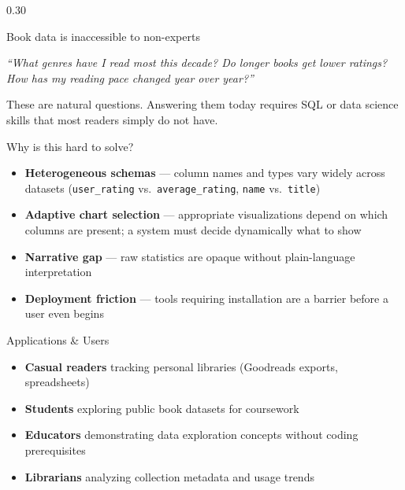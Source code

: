 \documentclass[final]{beamer}
\begin{document}
\begin{frame}[t]{}
\begin{columns}[T,totalwidth=\linewidth]
\begin{column}{0.30\linewidth}
\begin{block}{Book data is inaccessible to non-experts}
    \vspace{0.5em}
    \begin{tcolorbox}[colback=white,colframe=gold,arc=3pt,boxrule=1.5pt]
      \textit{``What genres have I read most this decade? Do longer books get
      lower ratings? How has my reading pace changed year over year?''}

      \vspace{0.4em}
      These are natural questions. Answering them today requires SQL or data
      science skills that most readers simply do not have.
    \end{tcolorbox}
  \end{block}

  \vspace{0.6em}

  \begin{block}{Why is this hard to solve?}
    \begin{itemize}[leftmargin=1.2em,itemsep=0.4em]
      \item \textbf{Heterogeneous schemas} — column names and types vary
            widely across datasets (\texttt{user\_rating} vs.\
            \texttt{average\_rating}, \texttt{name} vs.\ \texttt{title})
      \item \textbf{Adaptive chart selection} — appropriate visualizations
            depend on which columns are present; a system must decide
            dynamically what to show
      \item \textbf{Narrative gap} — raw statistics are opaque without
            plain-language interpretation
      \item \textbf{Deployment friction} — tools requiring installation
            are a barrier before a user even begins
    \end{itemize}
  \end{block}

  \vspace{0.6em}

  \begin{block}{Applications \& Users}
    \begin{itemize}[leftmargin=1.2em,itemsep=0.4em]
      \item \textbf{Casual readers} tracking personal libraries (Goodreads
            exports, spreadsheets)
      \item \textbf{Students} exploring public book datasets for coursework
      \item \textbf{Educators} demonstrating data exploration concepts
            without coding prerequisites
      \item \textbf{Librarians} analyzing collection metadata and usage trends
    \end{itemize}
  \end{block}


\end{column}
\end{columns}
\end{frame}
\end{document}
